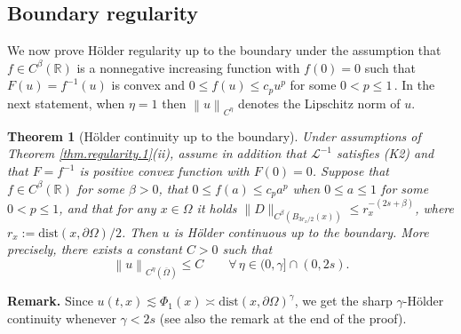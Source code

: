 \documentclass[11pt]{article}
\newtheorem{thm}{Theorem}[section]
\numberwithin{equation}{section}
\newcommand{\AI}{\mathcal{L}^{-1}}
\newcommand{\n}{F}
\newcommand{\RR}{\mathbb{R}}
\def\dist{\mathrm{dist}} %
\begin{document}
\subsection{Boundary regularity}



\medskip

We now prove H\"older regularity up to the boundary under the assumption that $f\in C^\beta(\RR)$ is a nonnegative increasing function with $f(0)=0$ such that $\n(u)=f^{-1}(u)$ is convex and $0\le f(u)\le c_p u^p$ for some $0<p\leq 1$\,. In the next statement, when $\eta=1$ then $\left\|u\right\|_{C^{\eta}}$ denotes the Lipschitz norm of $u$.

\begin{thm}[H\"older continuity up to the boundary]\label{thm.regularity.2}
Under  assumptions of Theorem \ref{thm.regularity.1}(ii),
assume in addition that $\AI$ satisfies (K2)
and that $\n=f^{-1}$ is positive convex function with $F(0)=0$. Suppose that $f\in C^\beta(\RR)$ for some $\beta>0$, that
$0\le f(a)\le c_p a^p$ when $0 \leq a \leq 1$ for some $0<p\leq 1$,
and that for any $x \in \Omega$ it holds $\|D\|_{C^\beta(B_{3r_x/2}(x))}\leq r_x^{-(2s+\beta)}$, where $r_x:=\dist(x,\partial\Omega)/2$. Then $u$ is H\"older continuous up to the boundary. More precisely, there exists  a constant $C>0$ such that
\begin{equation}\label{thm.regularity.2.bounds}
\left\|u\right\|_{C^{\eta}(\overline{\Omega})}\le C\qquad \forall\,\eta \in (0,\gamma]\cap(0,2s).
\end{equation}
\end{thm}
\noindent\textbf{Remark. } Since $u(t,x)\lesssim \Phi_1(x)\asymp\dist(x,\partial\Omega)^{\gamma}$, we get the sharp $\gamma$-H\"older continuity whenever $\gamma<2s$
(see also the remark at the end of the proof).
\end{document}
